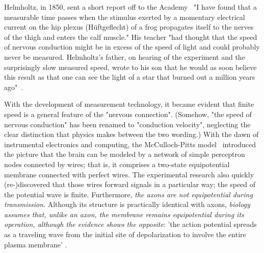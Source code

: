 {


Helmholtz, in 1850, sent a short report off to the Academy~\cite{ HelmholtzReport:1850}
"I have found that a measurable time passes when the stimulus exerted
by a momentary electrical current on the hip plexus (Hüftgeflecht) of
a frog propagates itself to the nerves of the thigh and enters the
calf muscle." His teacher "had thought that the speed of nervous
conduction might be in excess of the speed of light and could probably
never be measured. Helmholtz's father, on hearing of the experiment
and the surprisingly slow measured speed, wrote to his son that he
would as soon believe this result as that one can see the light of
a star that burned out a million years ago"~\cite{HelmoltzHistory:1851}.

With the development of measurement technology, it became evident
that finite speed is a general feature of the "nervous connection".
(Somehow, "the speed of nervous conduction" has been renamed to
"conduction velocity", neglecting the clear distinction that physics
makes between the two wording.) With the dawn of instrumental electronics
and computing, the McCulloch-Pitts model~\cite{LogicalCalculusMcCulloch:1943}
introduced the picture that the brain can be modeled by a network
of simple perceptron nodes connected by wires; that is, it comprises
a two-state equipotential membrane connected with perfect wires. The
experimental research also quickly (re-)discovered that those wires
forward signals in a particular way; the speed of the potential wave
is finite.
Furthermore, \textit{the axons are not equipotential during transmission}.
Although its structure is practically identical with axons, \textit{biology
assumes that, unlike an axon, the membrane remains equipotential during
its operation, although the evidence shows the opposite}: 'the action potential spreads as a traveling wave from the initial site of depolarization
to involve the entire plasma membrane' \cite{MolecularBiology:2002}.

}
